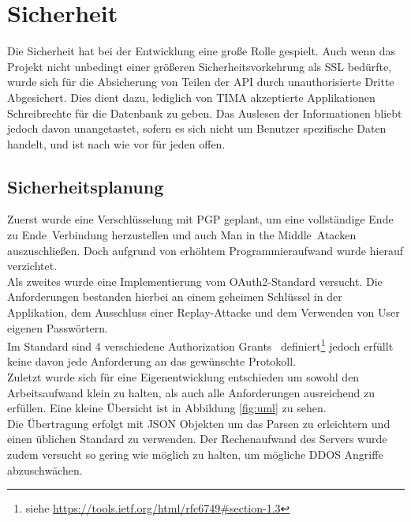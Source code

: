 \section{Sicherheit}
Die Sicherheit hat bei der Entwicklung eine große Rolle gespielt.  Auch wenn
das Projekt nicht unbedingt einer größeren Sicherheitsvorkehrung als SSL
bedürfte, wurde sich für die Absicherung von Teilen der API durch
unauthorisierte Dritte Abgesichert. Dies dient dazu, lediglich von TIMA
akzeptierte Applikationen Schreibrechte für die Datenbank zu geben.  Das Auslesen
der Informationen bliebt jedoch davon unangetastet, sofern es sich nicht um Benutzer spezifische Daten handelt, und ist nach wie vor für
jeden offen.

\subsection*{Sicherheitsplanung}
Zuerst wurde eine Verschlüsselung mit PGP geplant, um eine
vollständige \glqq Ende zu Ende\grqq~Verbindung herzustellen und auch \glqq Man
in the Middle\grqq~Atacken auszuschließen. Doch aufgrund von erhöhtem
Programmieraufwand wurde hierauf verzichtet.\\

Als zweites wurde eine Implementierung vom OAuth2-Standard versucht.
Die Anforderungen bestanden hierbei an einem geheimen Schlüssel in der
Applikation, dem Ausschluss einer Replay-Attacke und dem Verwenden von
User eigenen Passwörtern.\\
Im Standard sind 4 verschiedene \glqq Authorization Grants\grqq~
definiert\footnote{siehe \url{https://tools.ietf.org/html/rfc6749\#section-1.3}}
jedoch erfüllt keine davon jede Anforderung an das gewünschte Protokoll.\\

Zuletzt wurde sich für eine Eigenentwicklung entschieden um sowohl den Arbeitsaufwand
klein zu halten, als auch alle Anforderungen ausreichend zu erfüllen.
Eine kleine Übersicht ist in Abbildung \ref{fig:uml} zu sehen.\\
Die Übertragung erfolgt mit JSON Objekten um das Parsen zu erleichtern und
einen üblichen Standard zu verwenden. Der Rechenaufwand des Servers wurde
zudem versucht so gering wie möglich zu halten, um mögliche DDOS Angriffe
abzuschwächen.

